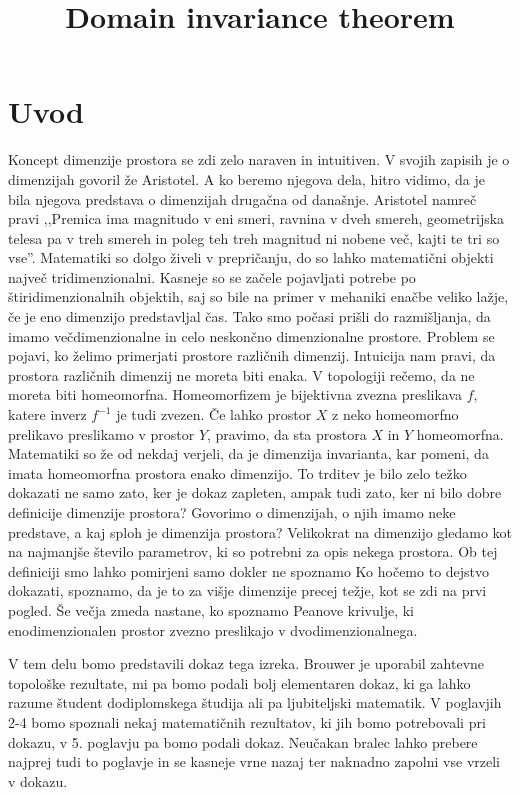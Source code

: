 \documentclass[mat1]{fmfdelo}
\title{Domain invariance theorem}
\newcommand{\0}{\underline{0}}
\begin{document}
\section{Uvod}
Koncept dimenzije prostora se zdi zelo naraven in intuitiven. V svojih zapisih je o dimenzijah govoril že Aristotel. A ko beremo njegova dela, hitro vidimo, da je bila njegova predstava o dimenzijah drugačna od današnje. Aristotel namreč pravi ,,Premica ima magnitudo v eni smeri, ravnina v dveh smereh, geometrijska telesa pa v treh smereh in poleg teh treh magnitud ni nobene več, kajti te tri so vse''. Matematiki so dolgo živeli v prepričanju, do so lahko matematični objekti največ tridimenzionalni. Kasneje so se začele pojavljati potrebe po štiridimenzionalnih objektih, saj so bile na primer v mehaniki enačbe veliko lažje, če je eno dimenzijo predstavljal čas. Tako smo počasi prišli do razmišljanja, da imamo večdimenzionalne in celo neskončno dimenzionalne prostore. Problem se pojavi, ko želimo primerjati prostore različnih dimenzij. Intuicija nam pravi, da prostora različnih dimenzij ne moreta biti enaka. V topologiji rečemo, da ne moreta biti homeomorfna. Homeomorfizem je bijektivna zvezna preslikava $f$, katere inverz $f^{-1}$ je tudi zvezen. Če lahko prostor $X$ z neko homeomorfno prelikavo preslikamo v prostor $Y$, pravimo, da sta prostora $X$ in $Y$ homeomorfna. Matematiki so že od nekdaj verjeli, da je dimenzija invarianta, kar pomeni, da imata homeomorfna prostora enako dimenzijo. To trditev je bilo zelo težko dokazati ne samo zato, ker je dokaz zapleten, ampak tudi zato, ker ni bilo dobre definicije dimenzije prostora? Govorimo o dimenzijah, o njih imamo neke predstave, a kaj sploh je dimenzija prostora? Velikokrat na dimenzijo gledamo kot na najmanjše število parametrov, ki so potrebni za opis nekega prostora. Ob tej definiciji smo lahko pomirjeni samo dokler ne spoznamo  Ko hočemo to dejstvo dokazati, spoznamo, da je to za višje dimenzije precej težje, kot se zdi na prvi pogled. Še večja zmeda nastane, ko spoznamo Peanove krivulje, ki enodimenzionalen prostor zvezno preslikajo v dvodimenzionalnega.

V tem delu bomo predstavili dokaz tega izreka. Brouwer je uporabil zahtevne topološke rezultate, mi pa bomo podali bolj elementaren dokaz, ki ga lahko razume študent dodiplomskega študija ali pa ljubiteljski matematik. V poglavjih 2-4 bomo spoznali nekaj matematičnih rezultatov, ki jih bomo potrebovali pri dokazu, v 5. poglavju pa bomo podali dokaz. Neučakan bralec lahko prebere najprej tudi to poglavje in se kasneje vrne nazaj ter naknadno zapolni vse vrzeli v dokazu.
\end{document}
